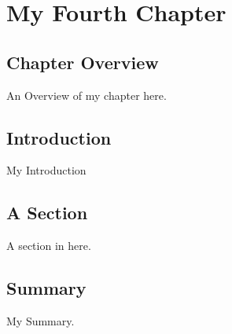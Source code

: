 \chapter{My Fourth Chapter}

\section{Chapter Overview}

An Overview of my chapter here.

\section{Introduction}

My Introduction

\section{A Section}

A section in here.

\section{Summary }

My Summary.